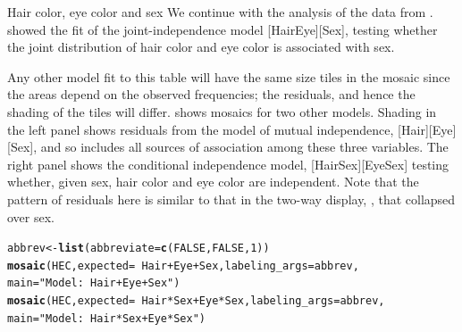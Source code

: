 \documentclass[11pt]{book}\usepackage[]{graphicx}\usepackage[]{color}
\makeatletter
\newcommand{\hlnum}[1]{\textcolor[rgb]{0.686,0.059,0.569}{#1}}%
\newcommand{\hlstr}[1]{\textcolor[rgb]{0.192,0.494,0.8}{#1}}%
\newcommand{\hlopt}[1]{\textcolor[rgb]{0,0,0}{#1}}%
\newcommand{\hlstd}[1]{\textcolor[rgb]{0.345,0.345,0.345}{#1}}%
\newcommand{\hlkwb}[1]{\textcolor[rgb]{0.69,0.353,0.396}{#1}}%
\newcommand{\hlkwc}[1]{\textcolor[rgb]{0.333,0.667,0.333}{#1}}%
\newcommand{\hlkwd}[1]{\textcolor[rgb]{0.737,0.353,0.396}{\textbf{#1}}}%
\newenvironment{kframe}{%
 \def\at@end@of@kframe{}%
 \ifinner\ifhmode%
  \def\at@end@of@kframe{\end{minipage}}%
  \begin{minipage}{\columnwidth}%
 \fi\fi%
 \def\FrameCommand##1{\hskip\@totalleftmargin \hskip-\fboxsep
 \colorbox{shadecolor}{##1}\hskip-\fboxsep
     \hskip-\linewidth \hskip-\@totalleftmargin \hskip\columnwidth}%
 \MakeFramed {\advance\hsize-\width
   \@totalleftmargin\z@ \linewidth\hsize
   \@setminipage}}%
 {\par\unskip\endMakeFramed%
 \at@end@of@kframe}
\newenvironment{knitrout}{}{} %
\renewenvironment{knitrout}{\small\renewcommand{\baselinestretch}{.85}}{} %
\makeatother
\begin{document}
\begin{Example}[HEC2]{Hair color, eye color and sex}
We continue with the analysis of the  data from
.   showed the fit of the
joint-independence model [HairEye][Sex], testing whether
the joint distribution of hair color and eye color is
associated with sex.

Any other model fit to this table will have the same size tiles in the mosaic
since the areas depend on the observed frequencies;  the residuals,
and hence the shading of the tiles will differ.  
shows mosaics for two other models. Shading in the left panel shows 
residuals from the model of mutual independence, [Hair][Eye][Sex], and so
includes all sources of association among these three variables.
The right panel shows the
conditional independence model, [HairSex][EyeSex]
testing whether, given sex, hair color and eye color are independent.
Note that the pattern of residuals here is
similar to that in the two-way display,
, that collapsed over sex.

\begin{knitrout}
\color{fgcolor}\begin{kframe}
\begin{alltt}
\hlstd{abbrev} \hlkwb{<-} \hlkwd{list}\hlstd{(}\hlkwc{abbreviate}\hlstd{=}\hlkwd{c}\hlstd{(}\hlnum{FALSE}\hlstd{,} \hlnum{FALSE}\hlstd{,} \hlnum{1}\hlstd{))}
\hlkwd{mosaic}\hlstd{(HEC,} \hlkwc{expected} \hlstd{=} \hlopt{~} \hlstd{Hair} \hlopt{+} \hlstd{Eye} \hlopt{+} \hlstd{Sex,} \hlkwc{labeling_args}\hlstd{=abbrev,}
  \hlkwc{main}\hlstd{=}\hlstr{"Model: ~Hair + Eye + Sex"}\hlstd{)}
\hlkwd{mosaic}\hlstd{(HEC,} \hlkwc{expected} \hlstd{=} \hlopt{~} \hlstd{Hair}\hlopt{*}\hlstd{Sex} \hlopt{+} \hlstd{Eye}\hlopt{*}\hlstd{Sex,} \hlkwc{labeling_args}\hlstd{=abbrev,}
        \hlkwc{main}\hlstd{=}\hlstr{"Model: ~Hair*Sex + Eye*Sex"}\hlstd{)}
\end{alltt}
\end{kframe}\begin{figure}[htbp]



\end{figure}
\end{knitrout}
\end{Example}
\end{document}
